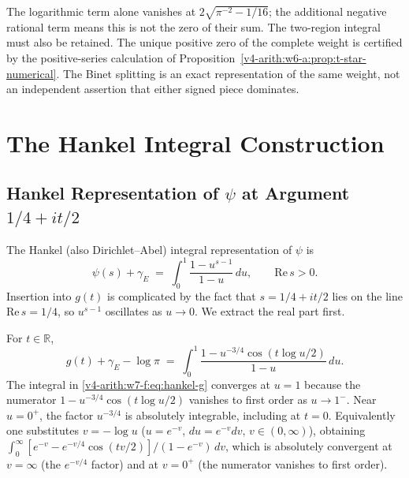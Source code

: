 \begin{remark}
\label{v4-arith:w7-f:rem:binet-t-star}
The logarithmic term alone vanishes at
\(2\sqrt{\pi^{-2}-1/16}\); the additional negative rational term
means this is not the zero of their sum. The two-region integral
must also be retained. The unique positive zero of the complete
weight is certified by the positive-series calculation of
Proposition~\ref{v4-arith:w6-a:prop:t-star-numerical}.
The Binet splitting is an exact representation of the same weight,
not an independent assertion that either signed piece dominates.
\end{remark}

\section{The Hankel Integral Construction}
\label{v4-arith:w7-f:hankel}

\subsection{Hankel Representation of \(\psi\) at Argument \(1/4+it/2\)}
\label{v4-arith:w7-f:hankel:representation}

The Hankel (also Dirichlet--Abel) integral representation of \(\psi\)
is
\begin{equation}
\label{v4-arith:w7-f:eq:hankel-abstract}
\psi(s)+\gamma_{E}\;=\;\int_{0}^{1}\frac{1-u^{s-1}}{1-u}\,du,\qquad\mathrm{Re}\,s>0.
\end{equation}
Insertion into \(g(t)\) is complicated by the fact that
\(s=1/4+it/2\) lies on the line \(\mathrm{Re}\,s=1/4\), so \(u^{s-1}\)
oscillates as \(u\to 0\). We extract the real part first.

\begin{lemma}
\label{v4-arith:w7-f:lem:hankel-g}
For \(t\in\mathbb{R}\),
\begin{equation}
\label{v4-arith:w7-f:eq:hankel-g}
g(t)+\gamma_{E}-\log\pi\;=\;\int_{0}^{1}\!\frac{1-u^{-3/4}\cos(t\log u/2)}{1-u}\,du.
\end{equation}
The integral in \eqref{v4-arith:w7-f:eq:hankel-g} converges at \(u=1\)
because the numerator \(1-u^{-3/4}\cos(t\log u/2)\) vanishes to first
order as \(u\to 1^{-}\). Near \(u=0^{+}\), the factor \(u^{-3/4}\) is
absolutely integrable, including at \(t=0\). Equivalently one
substitutes \(v=-\log u\) (\(u=e^{-v}\), \(du=e^{-v}dv\), \(v\in(0,\infty)\)),
obtaining
\(\int_{0}^{\infty}[e^{-v}-e^{-v/4}\cos(tv/2)]/(1-e^{-v})\,dv\),
which is absolutely convergent at \(v=\infty\) (the \(e^{-v/4}\) factor)
and at \(v=0^{+}\) (the numerator vanishes to first order).
\end{lemma}

